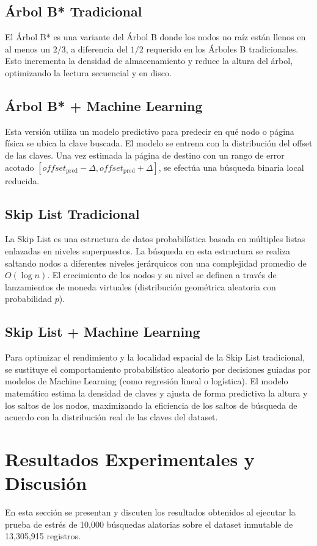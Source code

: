 \documentclass[twocolumn,10pt,journal]{IEEEtran}
\begin{document}
\subsection{\'Arbol B* Tradicional}
El Árbol B* es una variante del Árbol B donde los nodos no raíz están llenos en al menos un $2/3$, a diferencia del $1/2$ requerido en los Árboles B tradicionales. Esto incrementa la densidad de almacenamiento y reduce la altura del árbol, optimizando la lectura secuencial y en disco.

\subsection{\'Arbol B* + Machine Learning}
Esta versión utiliza un modelo predictivo para predecir en qué nodo o página física se ubica la clave buscada. El modelo se entrena con la distribución del offset de las claves. Una vez estimada la página de destino con un rango de error acotado $[offset_{\text{pred}} - \Delta, offset_{\text{pred}} + \Delta]$, se efectúa una búsqueda binaria local reducida.

\subsection{Skip List Tradicional}
La Skip List es una estructura de datos probabilística basada en múltiples listas enlazadas en niveles superpuestos. La búsqueda en esta estructura se realiza saltando nodos a diferentes niveles jerárquicos con una complejidad promedio de $O(\log n)$. El crecimiento de los nodos y su nivel se definen a través de lanzamientos de moneda virtuales (distribución geométrica aleatoria con probabilidad $p$).

\subsection{Skip List + Machine Learning}
Para optimizar el rendimiento y la localidad espacial de la Skip List tradicional, se sustituye el comportamiento probabilístico aleatorio por decisiones guiadas por modelos de Machine Learning (como regresión lineal o logística). El modelo matemático estima la densidad de claves y ajusta de forma predictiva la altura y los saltos de los nodos, maximizando la eficiencia de los saltos de búsqueda de acuerdo con la distribución real de las claves del dataset.

\section{Resultados Experimentales y Discusi\'on}
En esta secci\'on se presentan y discuten los resultados obtenidos al ejecutar la prueba de estr\'es de 10,000 b\'usquedas alatorias sobre el dataset inmutable de 13,305,915 registros.
\end{document}
